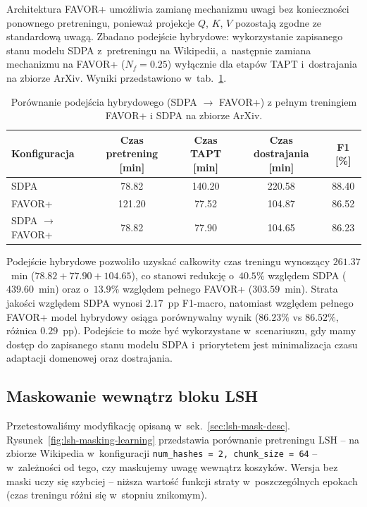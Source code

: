 \documentclass[a4paper,11pt,twoside]{report}
\theoremstyle{definition}
\begin{document}
Architektura FAVOR+ umożliwia zamianę mechanizmu uwagi bez konieczności ponownego pretreningu, ponieważ projekcje $Q$, $K$, $V$ pozostają zgodne ze standardową uwagą. Zbadano podejście hybrydowe: wykorzystanie zapisanego stanu modelu SDPA z~pretreningu na Wikipedii, a~następnie zamiana mechanizmu na FAVOR+ ($N_f{=}0.25$) wyłącznie dla etapów TAPT i~dostrajania na zbiorze ArXiv. Wyniki przedstawiono w~tab.~\ref{tab:hybrid-experiment}.

\begin{table}[h!]
\centering
\caption{Porównanie podejścia hybrydowego (SDPA $\rightarrow$ FAVOR+) z pełnym treningiem FAVOR+ i SDPA na zbiorze ArXiv.}
\smallskip
\label{tab:hybrid-experiment}
\small
\begin{tabular}{@{}lcccc@{}}
\toprule
\textbf{Konfiguracja} & \textbf{Czas pretrening [min]} & \textbf{Czas TAPT [min]} & \textbf{Czas dostrajania [min]} & \textbf{F1 [\%]} \\
\midrule
SDPA & 78.82 & 140.20 & 220.58 & 88.40 \\
FAVOR+ & 121.20 & 77.52 & 104.87 & 86.52 \\
SDPA $\rightarrow$ FAVOR+ & 78.82 & 77.90  & 104.65 & 86.23 \\
\bottomrule
\end{tabular}
\end{table}

Podejście hybrydowe pozwoliło uzyskać całkowity czas treningu wynoszący $261.37$~min ($78.82 + 77.90 + 104.65$), co stanowi redukcję o~$40.5\%$ względem SDPA ($439.60$~min) oraz o~$13.9\%$ względem pełnego FAVOR+ ($303.59$~min). Strata jakości względem SDPA wynosi $2.17$~pp F1-macro, natomiast względem pełnego FAVOR+ model hybrydowy osiąga porównywalny wynik ($86.23\%$ vs $86.52\%$, różnica $0.29$~pp). Podejście to może być wykorzystane w~scenariuszu, gdy mamy dostęp do zapisanego stanu modelu SDPA i~priorytetem jest minimalizacja czasu adaptacji domenowej oraz dostrajania.

\subsection{Maskowanie wewnątrz bloku LSH}\label{sec:lsh-mask-experiment}

Przetestowaliśmy modyfikację opisaną w~sek.~\ref{sec:lsh-mask-desc}. Rysunek~\ref{fig:lsh-masking-learning} przedstawia porównanie pretreningu LSH -- na zbiorze Wikipedia w~konfiguracji \texttt{num\_hashes = 2, chunk\_size = 64} -- w~zależności od tego, czy maskujemy uwagę wewnątrz koszyków. 
Wersja bez maski uczy się szybciej -- niższa wartość funkcji straty w~poszczególnych epokach (czas treningu różni się w~stopniu znikomym).
\end{document}

